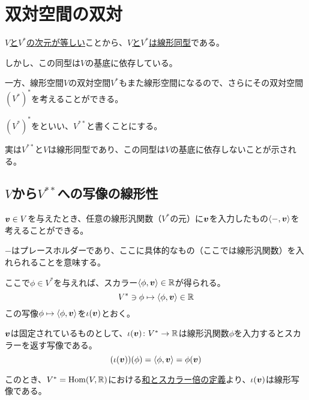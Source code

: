 \documentclass[../../../topic_linear-algebra]{subfiles}
\begin{document}
\sectionline
\section{双対空間の双対}

\hyperref[thm:dual-basis-dimension]{$V$と$V^*$の次元が等しい}ことから、\hyperref[thm:abstract-linear-pigeonhole]{$V$と$V^*$は線形同型}である。

しかし、この同型は$V$の基底に依存している。

\br

一方、線形空間$V$の双対空間$V^*$もまた線形空間になるので、さらにその双対空間$(V^*)^*$を考えることができる。

$(V^*)^*$をといい、$V^{**}$と書くことにする。

\br

実は$V^{**}$と$V$は線形同型であり、この同型は$V$の基底に依存しないことが示される。

\subsection{$V$から$V^{**}$への写像の線形性}

$\vb*{v} \in V$を与えたとき、任意の線形汎関数（$V^*$の元）に$\vb*{v}$を入力したもの$\langle -, \vb*{v} \rangle$を考えることができる。

\begin{supplnote}
  $-$はプレースホルダーであり、ここに具体的なもの（ここでは線形汎関数）を入れられることを意味する。
\end{supplnote}

ここで$\phi \in V^*$を与えれば、スカラー$\langle \phi, \vb*{v} \rangle \in \mathbb{R}$が得られる。
\begin{equation*}
  V^* \ni \phi \mapsto \langle \phi, \vb*{v} \rangle \in \mathbb{R}
\end{equation*}
この写像$\phi \mapsto \langle \phi, \vb*{v} \rangle$を$\iota(\vb*{v})$とおく。

$\vb*{v}$は固定されているものとして、$\iota(\vb*{v}) \colon V^* \to \mathbb{R}$は線形汎関数$\phi$を入力するとスカラーを返す写像である。
\begin{equation*}
  (\iota(\vb*{v}))(\phi) = \langle \phi, \vb*{v} \rangle = \phi(\vb*{v})
\end{equation*}

このとき、$V^* = \operatorname{Hom}(V, \mathbb{R})$における\hyperref[def:linear-map-addition-scalar]{和とスカラー倍の定義}より、$\iota(\vb*{v})$は線形写像である。
\end{document}
